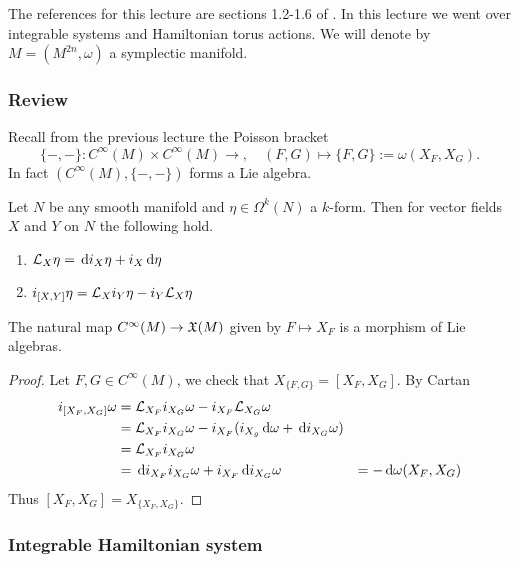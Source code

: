 The references for this lecture are sections 1.2-1.6 of \cite{Evans_2023}.
In this lecture we went over integrable systems and Hamiltonian torus actions.
We will denote by $M=(M^{2n},\omega)$ a symplectic manifold.

\subsubsection*{Review}

Recall from the previous lecture the Poisson bracket
\[\{-,-\}:C^\infty(M)\times C^\infty(M)\to ,\quad (F,G)\mapsto\{F,G\}:=\omega(X_F,X_G).\]
In fact $(C^\infty(M),\{-,-\})$ forms a Lie algebra.


\begin{thm}
    Let $N$ be any smooth manifold and $\eta\in\Omega^k(N)$ a $k$-form.
    Then for vector fields $X$ and $Y$ on $N$ the following hold.
    \begin{enumerate}
        \item $\mathcal{L}_X\eta=\,\mathrm d i_X\eta+i_X\,\mathrm d\eta$
        \item $i_{[X,Y]}\eta=\mathcal{L}_Xi_Y\eta-i_Y\mathcal{L}_X\eta$
    \end{enumerate}
\end{thm}

\begin{cor}
    The natural map $C^\infty(M)\to\mathfrak{X}(M)$ given by $F\mapsto X_F$ is a morphism of Lie algebras.
\end{cor}

\begin{proof}
    Let $F,G\in C^\infty(M)$, we check that $X_{\{F,G\}}=[X_F,X_G]$.
    By Cartan
    \begin{align*}
        i_{[X_F,X_G]}\omega&=\mathcal{L}_{X_F}i_{X_G}\omega-i_{X_F}\mathcal{L}_{X_G}\omega\\
        &=\mathcal{L}_{X_F}i_{X_G}\omega-i_{X_F}(i_{X_g}\,\mathrm d\omega+\,\mathrm d i_{X_G}\omega)\\
        &=\mathcal{L}_{X_F}i_{X_G}\omega\\
        &=\,\mathrm d i_{X_F}i_{X_G}\omega+i_{X_F}\,\mathrm d i_{X_G}\omega
        &=-\,\mathrm d\omega(X_F,X_G)
    \end{align*}
    Thus $[X_F,X_G]=X_{\{X_F,X_G\}}$.
\end{proof}

\subsubsection*{Integrable Hamiltonian system}

